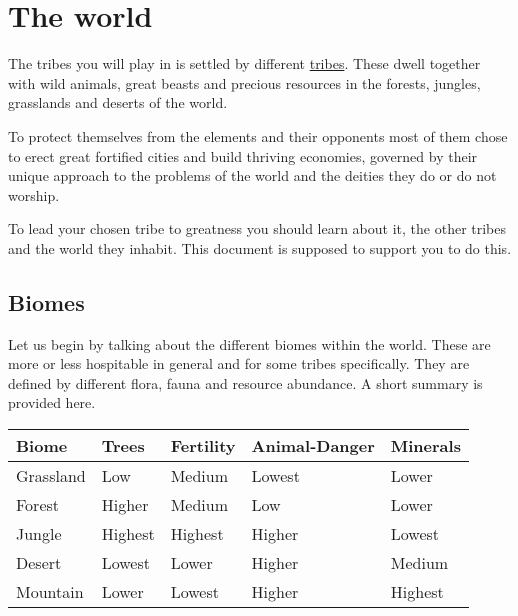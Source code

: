 \chapter{The world}\label{ch:World}

The tribes you will play in is settled by different
\hyperref[ch:Tribes]{tribes}. These dwell together with wild animals, great
beasts and precious resources in the forests, jungles, grasslands and deserts
of the world.

To protect themselves from the elements and their opponents most of them chose
to erect great fortified cities and build thriving economies, governed by their
unique approach to the problems of the world and the deities they do or do not
worship.

To lead your chosen tribe to greatness you should learn about it, the other
tribes and the world they inhabit. This document is supposed to support you to
do this.

\section{Biomes}\label{ch:World:Biomes}

Let us begin by talking about the different biomes within the world. These are
more or less hospitable in general and for some tribes specifically. They are
defined by different flora, fauna and resource abundance. A short summary is
provided here.

\begin{longtable}{lllll}
	\toprule
	Biome           & Trees   & Fertility & Animal-Danger & Minerals \\
	\midrule
	\Gls{Grassland} & Low     & Medium    & Lowest        & Lower    \\
	\Gls{Forest}    & Higher  & Medium    & Low           & Lower    \\
	\Gls{Jungle}    & Highest & Highest   & Higher        & Lowest   \\
	\Gls{Desert}    & Lowest  & Lower     & Higher        & Medium   \\
	\Gls{Mountain}  & Lower   & Lowest    & Higher        & Highest  \\
	\bottomrule
\end{longtable}

\subsection{}\label{ch:World:Biomes:Grassland}

